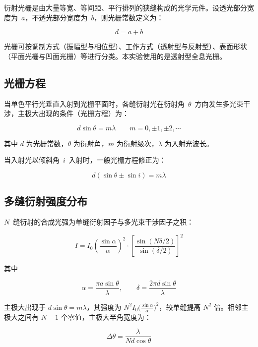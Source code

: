 \documentclass[12pt, a4paper]{article}
\begin{document}
衍射光栅是由大量等宽、等间距、平行排列的狭缝构成的光学元件。设透光部分宽度为~$a$，不透光部分宽度为~$b$，则光栅常数定义为：

\begin{equation}
  d = a + b
\end{equation}

光栅可按调制方式（振幅型与相位型）、工作方式（透射型与反射型）、表面形状（平面光栅与凹面光栅）等进行分类。本实验使用的是透射型全息光栅。

\subsection{光栅方程}

当单色平行光垂直入射到光栅平面时，各缝衍射光在衍射角~$\theta$~方向发生多光束干涉，主极大出现的条件（光栅方程）为：

\begin{equation}
  d \sin\theta = m\lambda \qquad m = 0, \pm1, \pm2, \cdots
\end{equation}

其中 $d$ 为光栅常数，$\theta$ 为衍射角，$m$ 为衍射级次，$\lambda$ 为入射光波长。

当入射光以倾斜角~$i$~入射时，一般光栅方程修正为：

\begin{equation}
  d(\sin\theta \pm \sin i) = m\lambda
\end{equation}

\subsection{多缝衍射强度分布}

$N$~缝衍射的合成光强为单缝衍射因子与多光束干涉因子之积：

\begin{equation}
  I = I_0 \left(\frac{\sin\alpha}{\alpha}\right)^2 \cdot
      \left[\frac{\sin(N\delta/2)}{\sin(\delta/2)}\right]^2
\end{equation}

其中

\[
  \alpha = \frac{\pi a \sin\theta}{\lambda}, \qquad
  \delta = \frac{2\pi d \sin\theta}{\lambda}
\]

主极大出现于 $d\sin\theta = m\lambda$，其强度为 $N^2 I_0\bigl(\tfrac{\sin\alpha}{\alpha}\bigr)^2$，较单缝提高 $N^2$ 倍。相邻主极大之间有 $N-1$ 个零值，主极大半角宽度为：

\begin{equation}
  \Delta\theta = \frac{\lambda}{Nd\cos\theta}
\end{equation}
\end{document}

